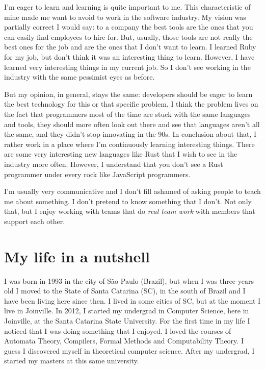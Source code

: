\documentclass[11pt,a4paper,sans]{moderncv}
\begin{document}
\medskip

I'm eager to learn and learning is quite important to me.
This characteristic of mine made me want to avoid to work in the software industry.
My vision was partially correct I would say:
to a company the best tools are the ones that you can easily find employees to hire for.
But, usually, those tools are not really the best ones for the job and are the ones that I don't want to learn.
I learned Ruby for my job, but don't think it was an interesting thing to learn.
However, I have learned very interesting things in my current job.
So I don't see working in the industry with the same pessimist eyes as before.

\medskip

But my opinion, in general, stays the same: developers should be eager to learn the best technology for this or that specific problem.
I think the problem lives on the fact that programmers most of the time are stuck with the same languages and tools, they should more often look out there and see that languages aren't all the same, and they didn't stop innovating in the 90s.
In conclusion about that, I rather work in a place where I'm continuously learning interesting things.
There are some very interesting new languages like Rust that I wish to see in the industry more often.
However, I understand that you don't see a Rust programmer under every rock like JavaScript programmers.

\medskip

I'm usually very communicative and I don't fill ashamed of asking people to teach me about something.
I don't pretend to know something that I don't.
Not only that, but I enjoy working with teams that do \textit{real team work} with members that support each other.

\section{My life in a nutshell}
I was born in 1993 in the city of São Paulo (Brazil), but when I was three years old I moved to the State of Santa Catarina (SC), in the south of Brazil and I have been living here since then.
I lived in some cities of SC, but at the moment I live in Joinville.
In 2012, I started my undergrad in Computer Science, here in Joinville, at the Santa Catarina State University.
For the first time in my life I noticed that I was doing something that I enjoyed.
I loved the courses of Automata Theory, Compilers, Formal Methods and Computability Theory.
I guess I discovered myself in theoretical computer science.
After my undergrad, I started my masters at this same university.
\end{document}
